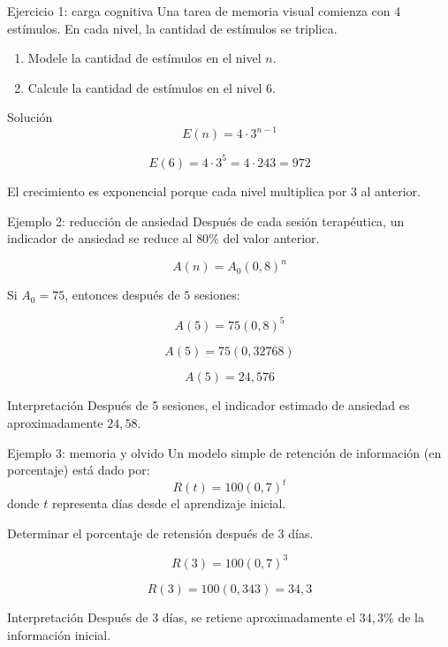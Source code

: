 \documentclass[handout,aspectratio=169]{beamer}
\begin{document}
	\begin{frame}{Ejercicio 1: carga cognitiva}
		Una tarea de memoria visual comienza con \(4\) estímulos. En cada nivel, la cantidad de estímulos se triplica.
		
		\begin{enumerate}
			\item Modele la cantidad de estímulos en el nivel \(n\).
			\item Calcule la cantidad de estímulos en el nivel \(6\).
		\end{enumerate}
		
		\pause
		
		\begin{block}{Solución}
			\[
			E(n)=4\cdot 3^{n-1}
			\]
			
			\[
			E(6)=4\cdot 3^5=4\cdot 243=972
			\]
			
			El crecimiento es exponencial porque cada nivel multiplica por \(3\) al anterior.
		\end{block}
	\end{frame}
	
	\begin{frame}{Ejemplo 2: reducción de ansiedad}
		Después de cada sesión terapéutica, un indicador de ansiedad se reduce al \(80\%\) del valor anterior.
		
		\[
		A(n)=A_0(0{,}8)^n
		\]
		
		Si \(A_0=75\), entonces después de \(5\) sesiones:
		
		\[
		A(5)=75(0{,}8)^5
		\]
		
		\[
		A(5)=75(0{,}32768)
		\]
		
		\[
		A(5)=24{,}576
		\]
		
		\begin{block}{Interpretación}
			Después de 5 sesiones, el indicador estimado de ansiedad es aproximadamente \(24{,}58\).
		\end{block}
	\end{frame}
	
	
	\begin{frame}{Ejemplo 3: memoria y olvido}
		Un modelo simple de retención de información (en porcentaje) está dado por:
		\[
		R(t)=100(0{,}7)^t
		\]
		donde \(t\) representa días desde el aprendizaje inicial.
		
		Determinar el porcentaje de retensión después de 3 días.
		
		\[
		R(3)=100(0{,}7)^3
		\]
		
		\[
		R(3)=100(0{,}343)=34{,}3
		\]
		
		\begin{block}{Interpretación}
			Después de 3 días, se retiene aproximadamente el \(34{,}3\%\) de la información inicial.
		\end{block}
	\end{frame}
	
\end{document}
